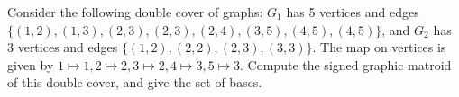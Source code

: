 Consider the following double cover of graphs: $G_1$ has 5 vertices and edges $\{(1,2),(1,3),(2,3),(2,3),(2,4),(3,5),(4,5),(4,5)\}$, and $G_2$ has $3$ vertices and edges $\{(1,2),(2,2),(2,3),(3,3)\}$. The map on vertices is given by $1 \mapsto 1, 2\mapsto 2, 3 \mapsto 2, 4\mapsto 3, 5\mapsto 3$. Compute the signed graphic matroid of this double cover, and give the set of bases.
